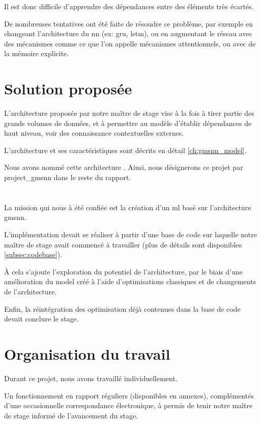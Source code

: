 Il est donc difficile d'apprendre des dépendances entre des éléments très écartés.

De nombreuses tentatives ont été faite de résoudre ce problème, par exemple en changeant l'architecture du \gls{nn} (ex: \gls{gru}, \gls{lstm}), ou en augmentant le réseau avec des mécanismes comme ce que l'on appelle mécanismes attentionnels, ou avec de la mémoire explicite.

\section{Solution proposée}
L'architecture proposée par notre maître de stage vise à la fois à tirer partie des grands volumes de données, et à permettre au modèle d'établir dépendances de haut niveau, voir des connaissance contextuelles externes.

L'architecture et ses caractéristiques sont décrits en détail \autoref{ch:gmsnn_model}.

Nous avons nommé cette architecture .
Ainsi, nous désignerons ce projet par \og \gls{project_gmsnn}\fg{} dans le reste du rapport.

\section{}
La mission qui nous à été confiée est la création d'un \gls{ml} basé sur l'architecture \gls{gmsnn}.

L'implémentation devait se réaliser à partir d'une base de code sur laquelle notre maître de stage avait commencé à travailler (plus de détails sont disponibles \autoref{subsec:codebase}).

À cela s'ajoute l'exploration du potentiel de l'architecture, par le biais d'une amélioration du \gls{model} créé à l'aide d'optimisations classiques et de changements de l'architecture.

Enfin, la réintégration des optimisation déjà contenues dans la base de code devait conclure le stage.

\section{Organisation du travail}
Durant ce projet, nous avons travaillé individuellement.

Un fonctionnement en rapport réguliers (disponibles en annexes), complémentés d'une occasionnelle correspondance électronique, à permis de tenir notre maître de stage informé de l'avancement du stage.


